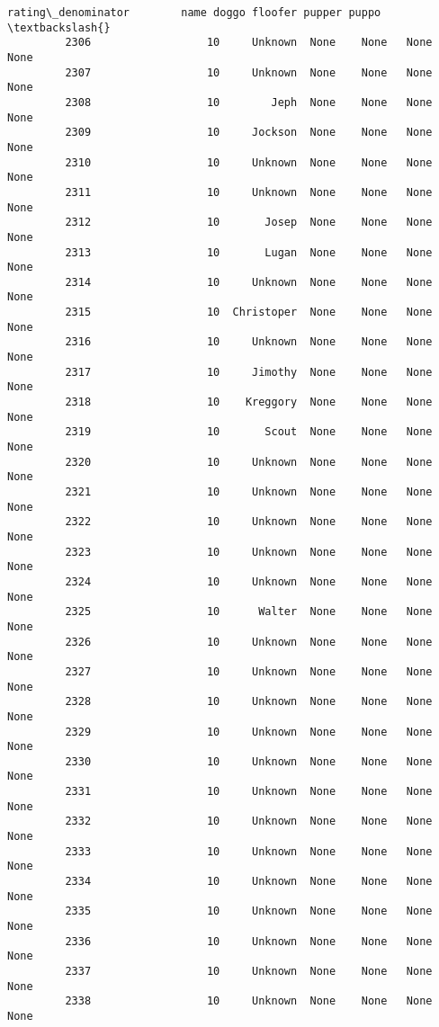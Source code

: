 \documentclass[11pt]{article}
\begin{document}
\begin{Verbatim}[commandchars=\\\{\}]
               rating\_denominator        name doggo floofer pupper puppo  \textbackslash{}
         2306                  10     Unknown  None    None   None  None   
         2307                  10     Unknown  None    None   None  None   
         2308                  10        Jeph  None    None   None  None   
         2309                  10     Jockson  None    None   None  None   
         2310                  10     Unknown  None    None   None  None   
         2311                  10     Unknown  None    None   None  None   
         2312                  10       Josep  None    None   None  None   
         2313                  10       Lugan  None    None   None  None   
         2314                  10     Unknown  None    None   None  None   
         2315                  10  Christoper  None    None   None  None   
         2316                  10     Unknown  None    None   None  None   
         2317                  10     Jimothy  None    None   None  None   
         2318                  10    Kreggory  None    None   None  None   
         2319                  10       Scout  None    None   None  None   
         2320                  10     Unknown  None    None   None  None   
         2321                  10     Unknown  None    None   None  None   
         2322                  10     Unknown  None    None   None  None   
         2323                  10     Unknown  None    None   None  None   
         2324                  10     Unknown  None    None   None  None   
         2325                  10      Walter  None    None   None  None   
         2326                  10     Unknown  None    None   None  None   
         2327                  10     Unknown  None    None   None  None   
         2328                  10     Unknown  None    None   None  None   
         2329                  10     Unknown  None    None   None  None   
         2330                  10     Unknown  None    None   None  None   
         2331                  10     Unknown  None    None   None  None   
         2332                  10     Unknown  None    None   None  None   
         2333                  10     Unknown  None    None   None  None   
         2334                  10     Unknown  None    None   None  None   
         2335                  10     Unknown  None    None   None  None   
         2336                  10     Unknown  None    None   None  None   
         2337                  10     Unknown  None    None   None  None   
         2338                  10     Unknown  None    None   None  None   

\end{Verbatim}
\end{document}
